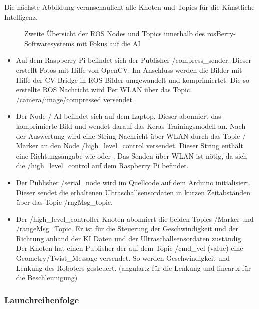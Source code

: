 \documentclass[conference]{IEEEtran}
\begin{document}
	Die nächste Abbildung veranschaulicht alle Knoten und Topics für die 
	Künstliche Intelligenz. 

	\begin{figure}[!ht] 
		\centering
		\def\svgwidth{\linewidth}
		
		\caption{Zweite Übersicht der ROS Nodes und Topics innerhalb des rosBerry-Softwaresystems mit Fokus auf die AI}
		\label{AI-Only}
	\end{figure}

	\begin{itemize}
		\item Auf dem Raspberry Pi befindet sich der Publisher 
		/compress\_sender. Dieser erstellt Fotos mit Hilfe von OpenCV. Im 
		Anschluss werden die Bilder mit Hilfe der CV-Bridge in ROS Bilder 
		umgewandelt und komprimiertet. Die so erstellte ROS Nachricht wird 
		Per WLAN über das Topic /camera/image/compressed versendet.
		
		\item Der Node / AI befindet sich auf dem Laptop. Dieser abonniert das 
		komprimierte Bild und wendet darauf das Keras Trainingsmodell an. 
		Nach der Auswertung wird eine String Nachricht über WLAN durch 
		das Topic / Marker an den Node /high\_level\_control versendet. 
		Dieser String enthält eine Richtungsangabe wie  oder 
		. Das Senden über WLAN ist nötig, da sich die  
		/high\_level\_control auf dem Raspberry Pi befindet.
		
		\item Der Publisher /serial\_node wird im Quellcode auf dem Arduino initialisiert. Dieser sendet die erhaltenen Ultraschallsensordaten in kurzen Zeitabständen über das Topic /rngMsg\_topic.
		
		\item Der /high\_level\_controller Knoten abonniert die beiden Topics 
		/Marker und /rangeMsg\_Topic. Er ist für die Steuerung der 
		Geschwindigkeit und der Richtung anhand der KI Daten und der 
		Ultraschallsensordaten zuständig. Der Knoten hat einen Publisher der 
		auf dem  Topic /cmd\_vel (value) eine Geometry/Twist\_Message 
		versendet. So werden Geschwindigkeit und Lenkung des Roboters 
		gesteuert. (angular.z für die Lenkung und linear.x für die 
		Beschleunigung)
		
		
	\end{itemize}

	\subsubsection{Launchreihenfolge}%
	
\end{document}
